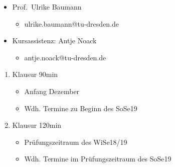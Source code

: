 \documentclass{../tudscript}
\begin{document}
\hypertarget{einfuxfchrung-in-die-mathematik-fuxfcr-informatikerinnen}{%
\label{einfuxfchrung-in-die-mathematik-fuxfcr-informatikerinnen}}

\hypertarget{vl}{%
\label{vl}}

\hypertarget{personen}{%
\label{personen}}

\begin{itemize}
\tightlist
\item
  Prof.~Ulrike Baumann

  \begin{itemize}
  \tightlist
  \item
    ulrike.baumann@tu-dresden.de
  \end{itemize}
\item
  Kursassistenz: Antje Noack

  \begin{itemize}
  \tightlist
  \item
    antje.noack@tu-dresden.de
  \end{itemize}
\end{itemize}

\hypertarget{klausuren}{%
\label{klausuren}}

\begin{enumerate}
\def\labelenumi{\arabic{enumi}.}
\tightlist
\item
  Klausur 90min

  \begin{itemize}
  \tightlist
  \item
    Anfang Dezember
  \item
    Wdh. Termine zu Beginn des SoSe19
  \end{itemize}
\item
  Klausur 120min

  \begin{itemize}
  \tightlist
  \item
    Prüfungszeitraum des WiSe18/19
  \item
    Wdh. Termine im Prüfungszeitraum des SoSe19
  \end{itemize}
\end{enumerate}

\hypertarget{hausaufgabe}{%
\label{hausaufgabe}}
\end{document}
